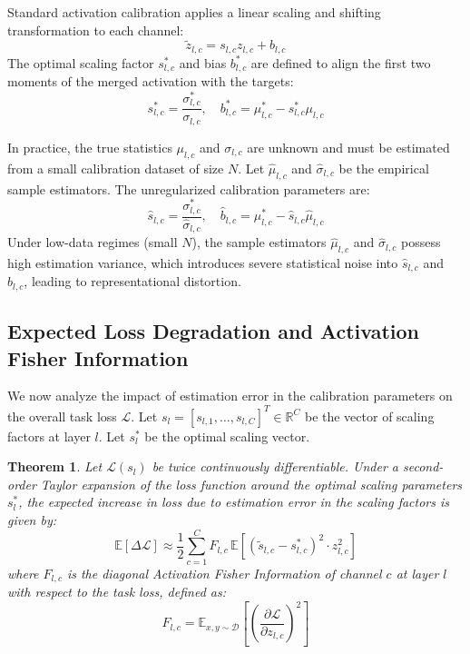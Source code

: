 \documentclass{article}
\theoremstyle{plain}
\newtheorem{theorem}{Theorem}[section]
\theoremstyle{definition}
\theoremstyle{remark}
\begin{document}
Standard activation calibration applies a linear scaling and shifting transformation to each channel:
\begin{equation}
    \tilde{z}_{l,c} = s_{l,c} z_{l,c} + b_{l,c}
\end{equation}
The optimal scaling factor $s^*_{l,c}$ and bias $b^*_{l,c}$ are defined to align the first two moments of the merged activation with the targets:
\begin{equation}
    s^*_{l,c} = \frac{\sigma^*_{l,c}}{\sigma_{l,c}}, \quad b^*_{l,c} = \mu^*_{l,c} - s^*_{l,c} \mu_{l,c}
\end{equation}

In practice, the true statistics $\mu_{l,c}$ and $\sigma_{l,c}$ are unknown and must be estimated from a small calibration dataset of size $N$. Let $\hat{\mu}_{l,c}$ and $\hat{\sigma}_{l,c}$ be the empirical sample estimators. The unregularized calibration parameters are:
\begin{equation}
    \hat{s}_{l,c} = \frac{\sigma^*_{l,c}}{\hat{\sigma}_{l,c}}, \quad \hat{b}_{l,c} = \mu^*_{l,c} - \hat{s}_{l,c} \hat{\mu}_{l,c}
\end{equation}
Under low-data regimes (small $N$), the sample estimators $\hat{\mu}_{l,c}$ and $\hat{\sigma}_{l,c}$ possess high estimation variance, which introduces severe statistical noise into $\hat{s}_{l,c}$ and $\hat{b}_{l,c}$, leading to representational distortion.

\subsection{Expected Loss Degradation and Activation Fisher Information}

We now analyze the impact of estimation error in the calibration parameters on the overall task loss $\mathcal{L}$. Let $s_l = [s_{l,1}, \dots, s_{l,C}]^T \in \mathbb{R}^C$ be the vector of scaling factors at layer $l$. Let $s^*_l$ be the optimal scaling vector. 

\begin{theorem}
\label{thm:taylor}
Let $\mathcal{L}(s_l)$ be twice continuously differentiable. Under a second-order Taylor expansion of the loss function around the optimal scaling parameters $s^*_l$, the expected increase in loss due to estimation error in the scaling factors is given by:
\begin{equation}
    \mathbb{E}[\Delta \mathcal{L}] \approx \frac{1}{2} \sum_{c=1}^C F_{l,c} \, \mathbb{E}[(\tilde{s}_{l,c} - s^*_{l,c})^2 \cdot z_{l,c}^2 ]
\end{equation}
where $F_{l,c}$ is the diagonal Activation Fisher Information of channel $c$ at layer $l$ with respect to the task loss, defined as:
\begin{equation}
    F_{l,c} = \mathbb{E}_{x, y \sim \mathcal{D}} \left[ \left( \frac{\partial \mathcal{L}}{\partial z_{l,c}} \right)^2 \right]
\end{equation}
\end{theorem}
\end{document}

